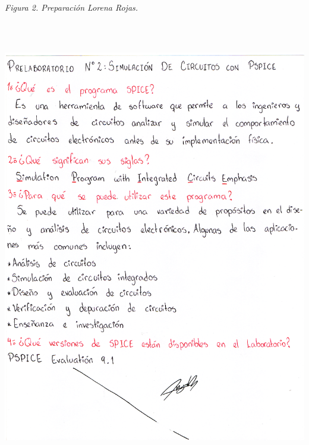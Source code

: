 \documentclass[12pt]{article}
\begin{document}
	\textit{Figura 2. Preparación Lorena Rojas.}
	\begin{center}
		\includegraphics[width=16cm,height=20cm]{Img/prelab_Lorena}
	\end{center}
	
\end{document}
